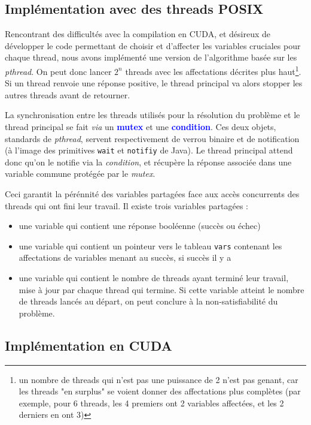 \documentclass{article}
\newcommand{\keyword}[1]{\textbf{\textcolor{blue}{#1}}}
\newcommand{\code}[1]{\texttt{{#1}}}
\newcommand{\cuda}{\textsc{CUDA}}
\begin{document}
\subsection{Implémentation avec des threads \textsc{POSIX}}
Rencontrant des difficultés avec la compilation en \cuda, et désireux de développer le code permettant de choisir et d'affecter les variables \og cruciales \fg pour chaque thread, nous avons implémenté une version de l'algorithme basée sur les \emph{pthread}. On peut donc lancer $2^{n}$ threads avec les affectations décrites plus haut\footnote{un nombre de threads qui n'est pas une puissance de 2 n'est pas genant, car les threads "en surplus" se voient donner des affectations plus complètes (par exemple, pour 6 threads, les 4 premiers ont 2 variables affectées, et les 2 derniers en ont 3)}. Si un thread renvoie une réponse positive, le thread principal va alors stopper les autres threads avant de retourner.

La synchronisation entre les threads utilisés pour la résolution du problème et le thread principal se fait \emph{via} un \keyword{mutex} et une \keyword{condition}. Ces deux objets, standards de \emph{pthread}, servent respectivement de verrou binaire et de notification (à l'image des primitives \code{wait} et \code{notifiy} de Java). Le thread principal attend donc qu'on le notifie via la \emph{condition}, et récupère la réponse associée dans une variable commune protégée par le \emph{mutex}. 

Ceci garantit la pérénnité des variables partagées face aux accès concurrents des threads qui ont fini leur travail. Il existe trois variables partagées :
\begin{itemize}
      \item une variable qui contient une réponse booléenne (succès ou échec)
      \item une variable qui contient un pointeur vers le tableau \code{vars} contenant les affectations de variables menant au succès, si succès il y a
      \item une variable qui contient le nombre de threads ayant terminé leur travail, mise à jour par chaque thread qui termine. Si cette variable atteint le nombre de threads lancés au départ, on peut conclure à la non-satisfiabilité du problème.
\end{itemize}


\subsection{Implémentation en \cuda}
\end{document}
